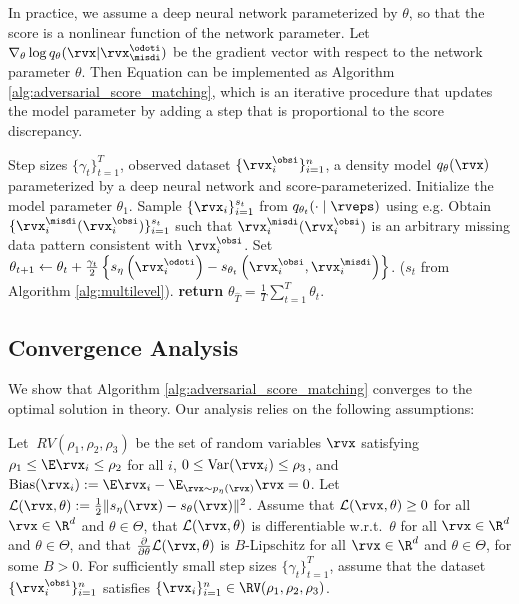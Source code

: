 \documentclass{article} %
\begin{document}
In practice, we assume a deep neural network parameterized by $\theta$, so that the score is a nonlinear function of the network parameter. Let $\nabla_{\theta} \log q_{\theta}(\rvx | \rvx_{\misdi}^{\odoti})$ be the gradient vector with respect to the network parameter $\theta$. Then Equation  can be implemented as Algorithm \ref{alg:adversarial_score_matching}, which is an iterative procedure that updates the model parameter by adding a step that is proportional to the score discrepancy.
\begin{algorithm}[tb]
	\caption{Adversarial Score Matching}
	\label{alg:adversarial_score_matching}
	\begin{algorithmic}[1]
		\REQUIRE Step sizes $\{\gamma_{t}\}_{t=1}^{T}$, observed dataset $\{\rvx_{i}^{\obsi}\}_{i=1}^{n}$, a density model $q_{\theta}(\rvx)$ parameterized by a deep neural network and score-parameterized.
		\STATE Initialize the model parameter $\theta_{1}$.
		\STATE Sample $\{\rvx_{i} \}_{i=1}^{s_{t}}$ from $q_{\theta_{t}}(\cdot \mid \rveps)$ using e.g.
		\STATE Obtain $\{\rvx_{i}^{\misdi}(\rvx_{i}^{\obsi}) \}_{i=1}^{s_{t}}$ such that $\rvx_{i}^{\misdi}(\rvx_{i}^{\obsi})$ is an arbitrary missing data pattern consistent with $\rvx_{i}^{\obsi}$.
		\STATE Set $\theta_{t+1} \leftarrow \theta_{t} + \frac{\gamma_{t}}{2} \left\{ s_{\eta}\left(\rvx_{i}^{\odoti} \right) - s_{\theta_{t}} \left( \rvx_{i}^{\obsi}, \rvx_{i}^{\misdi} \right) \right\}$. ($s_{t}$ from Algorithm \ref{alg:multilevel}).
		\ENDFOR
		\STATE \textbf{return} $\theta_{\hat{T}}=\frac{1}{T} \sum_{t=1}^{T} \theta_{t}$.
	\end{algorithmic}
\end{algorithm}

\subsection{Convergence Analysis}
We show that Algorithm \ref{alg:adversarial_score_matching} converges to the optimal solution in theory. Our analysis relies on the following assumptions:
\begin{assumption}%
	\label{assumption1}
	Let $\ RV(\rho_{1}, \rho_{2}, \rho_{3})$ be the set of random variables $\rvx$ satisfying $\rho_{1} \leq \E \rvx_{i} \leq \rho_{2}$ for all $i$, $0 \leq \operatorname{Var}(\rvx_{i}) \leq \rho_{3}$, and $\operatorname{Bias}(\rvx_{i}) := \E \rvx_{i} - \E_{\rvx \sim p_{\eta}(\rvx)} \rvx = 0$.
	Let $\mathcal{L}(\rvx, \theta) := \frac{1}{2} \| s_{\eta}(\rvx) - s_{\theta}(\rvx) \|^2$. Assume that $\mathcal{L}(\rvx, \theta) \geq 0$ for all $\rvx \in \R^{d}$ and $\theta \in \Theta$, that $\mathcal{L}(\rvx, \theta)$ is differentiable w.r.t.\ $\theta$ for all $\rvx \in \R^{d}$ and $\theta \in \Theta$, and that $\frac{\partial}{\partial \theta} \mathcal{L}(\rvx, \theta)$ is $B$-Lipschitz for all $\rvx \in \R^{d}$ and $\theta \in \Theta$, for some $B > 0$. For sufficiently small step sizes $\{\gamma_{t}\}_{t=1}^{T}$, assume that the dataset $\{\rvx_{i}^{\obsi}\}_{i=1}^{n}$ satisfies $\{\rvx_{i}\}_{i=1}^{n} \in \RV(\rho_{1}, \rho_{2}, \rho_{3})$. 
\end{assumption}
\end{document}
